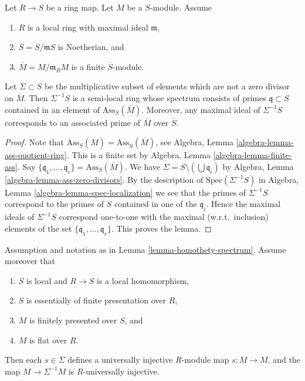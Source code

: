 \begin{lemma}
\label{lemma-homothety-spectrum}
Let $R \to S$ be a ring map.
Let $M$ be a $S$-module.
Assume
\begin{enumerate}
\item $R$ is a local ring with maximal ideal $\mathfrak m$,
\item $\overline{S} = S/\mathfrak m S$ is Noetherian, and
\item $\overline{M} = M/\mathfrak m_R M$ is a finite $\overline{S}$-module.
\end{enumerate}
Let $\Sigma \subset S$ be the multiplicative subset of elements which are not
a zero divisor on $\overline{M}$. Then $\Sigma^{-1}S$ is a semi-local ring
whose spectrum consists of primes $\mathfrak q \subset S$ contained in an
element of $\text{Ass}_S(\overline{M})$. Moreover, any maximal
ideal of $\Sigma^{-1}S$ corresponds to an associated prime of
$\overline{M}$ over $\overline{S}$.
\end{lemma}

\begin{proof}
Note that
$\text{Ass}_S(\overline{M}) = \text{Ass}_{\overline{S}}(\overline{M})$, see
Algebra, Lemma \ref{algebra-lemma-ass-quotient-ring}.
This is a finite set by
Algebra, Lemma \ref{algebra-lemma-finite-ass}.
Say $\{\mathfrak q_1, \ldots, \mathfrak q_r\} = \text{Ass}_S(\overline{M})$.
We have $\Sigma = S \setminus (\bigcup \mathfrak q_i)$ by
Algebra, Lemma \ref{algebra-lemma-ass-zero-divisors}.
By the description of $\text{Spec}(\Sigma^{-1}S)$ in
Algebra, Lemma \ref{algebra-lemma-spec-localization}
we see that the primes of $\Sigma^{-1}S$ correspond to the primes of
$S$ contained in one of the $\mathfrak q_i$.
Hence the maximal ideals of $\Sigma^{-1}S$ correspond one-to-one with the
maximal (w.r.t.\ inclusion) elements of the set
$\{\mathfrak q_1, \ldots, \mathfrak q_r\}$. This proves the lemma.
\end{proof}

\begin{lemma}
\label{lemma-homothety-universally-injective}
Assumption and notation as in
Lemma \ref{lemma-homothety-spectrum}.
Assume moreover that
\begin{enumerate}
\item $S$ is local and $R \to S$ is a local homomorphism,
\item $S$ is essentially of finite presentation over $R$,
\item $M$ is finitely presented over $S$, and
\item $M$ is flat over $R$.
\end{enumerate}
Then each $s \in \Sigma$ defines a
universally injective $R$-module map $s : M \to M$, and the
map $M \to \Sigma^{-1}M$ is $R$-universally injective.
\end{lemma}

